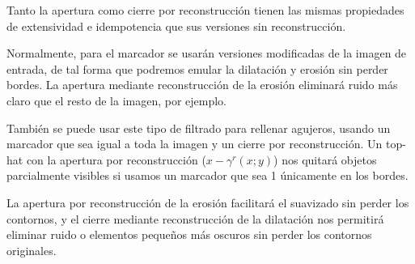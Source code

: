 \documentclass[nochap,palatino,notitlepage]{apuntes}
\begin{document}
Tanto la apertura como cierre por reconstrucción tienen las mismas propiedades de extensividad e idempotencia que sus versiones sin reconstrucción.

Normalmente, para el marcador se usarán versiones modificadas de la imagen de entrada, de tal forma que podremos emular la dilatación y erosión sin perder bordes. La apertura mediante reconstrucción de la erosión eliminará ruido más claro que el resto de la imagen, por ejemplo.

También se puede usar este tipo de filtrado para rellenar agujeros, usando un marcador que sea igual a toda la imagen y un cierre por reconstrucción. Un top-hat con la apertura por reconstrucción ($x - γ^r (x;y)$) nos quitará objetos parcialmente visibles si usamos un marcador que sea 1 únicamente en los bordes.

La apertura por reconstrucción de la erosión facilitará el suavizado sin perder los contornos, y el cierre mediante reconstrucción de la dilatación nos permitirá eliminar ruido o elementos pequeños más oscuros sin perder los contornos originales.
\end{document}
